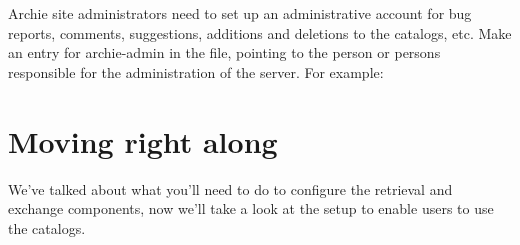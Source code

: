 Archie site administrators need to set up an administrative account for bug
reports, comments, suggestions, additions and deletions to the catalogs,
etc. Make an entry for archie-admin in the  file, pointing
to the person or persons responsible for the administration of the server. For
example:


%
%
%

\section{Moving right along}

We've talked about what you'll need to do to configure the retrieval and
exchange components, now we'll take a look at the setup to enable users to use
the catalogs.

